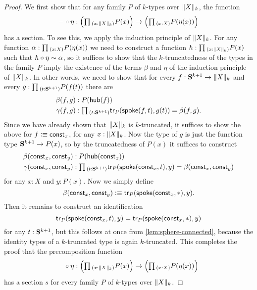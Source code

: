 \begin{proof}
  We first show that for any family $P$ of $k$-types over $\trunc{k}{X}$, the function
  \begin{equation*}
    \blank\circ\eta:\Big(\prd{x:\trunc{k}{X}}P(x)\Big)\to\Big(\prd{x:X}P(\eta(x))\Big)
  \end{equation*}
  has a section. To see this, we apply the induction principle of $\trunc{k}{X}$. For any function $\alpha:\prd{x:X}P(\eta(x))$ we need to construct a function $h:\prd{x:\trunc{k}{X}}P(x)$ such that $h\circ\eta\htpy\alpha$, so it suffices to show that the $k$-truncatedness of the types in the family $P$ imply the existence of the terms $\beta$ and $\eta$ of the induction principle of $\trunc{k}{X}$. In other words, we need to show that for every $f:\sphere{k+1}\to\trunc{k}{X}$ and every $g:\prd{t:\sphere{k+1}}P(f(t))$ there are
  \begin{align*}
    \beta(f,g) & : P(\mathsf{hub}(f)) \\
    \gamma(f,g) & : \prd{t:\sphere{k+1}}\tr_P(\mathsf{spoke}(f,t),g(t))=\beta(f,g).
  \end{align*}
  Since we have already shown that $\trunc{k}{X}$ is $k$-truncated, it suffices to show the above for $f\defeq\const_x$, for any $x:\trunc{k}{X}$. Now the type of $g$ is just the function type $\sphere{k+1}\to P(x)$, so by the truncatedness of $P(x)$ it suffices to construct
  \begin{align*}
    \beta(\const_x,\const_y) & : P(\mathsf{hub}(\const_x)) \\
    \gamma(\const_x,\const_y) & : \prd{t:\sphere{k+1}}\tr_P(\mathsf{spoke}(\const_x,t),y)=\beta(\const_x,\const_y)
  \end{align*}
  for any $x:X$ and $y:P(x)$. Now we simply define
  \begin{equation*}
    \beta(\const_x,\const_y) \defeq \tr_P(\mathsf{spoke}(\const_x,\ast),y).
  \end{equation*}
  Then it remains to construct an identification
  \begin{equation*}
    \tr_P(\mathsf{spoke}(\const_x,t),y)=\tr_P(\mathsf{spoke}(\const_x,\ast),y)
  \end{equation*}
  for any $t:\sphere{k+1}$, but this follows at once from \cref{lem:sphere-connected}, because the identity types of a $k$-truncated type is again $k$-truncated. This completes the proof that the precomposition function
  \begin{equation*}
    \blank\circ\eta:\Big(\prd{x:\trunc{k}{X}}P(x)\Big)\to\Big(\prd{x:X}P(\eta(x))\Big)
  \end{equation*}
  has a section $s$ for every family $P$ of $k$-types over $\trunc{k}{X}$.


\end{proof}
